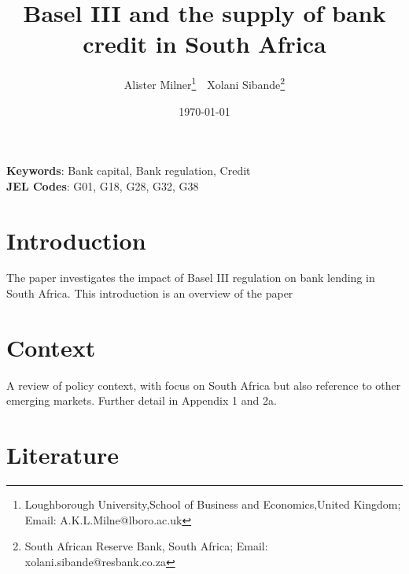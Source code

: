 \documentclass[
]{article}
\author{}
\date{\vspace{-2.5em}}
\begin{document}
\title{Basel III and the supply of bank credit in South Africa}


\author { 
Alister Milner\footnote{Loughborough University,School of Business and Economics,United Kingdom; Email: A.K.L.Milne@lboro.ac.uk}  \,\, 
Xolani Sibande\footnote{South African Reserve Bank, South Africa; Email: xolani.sibande@resbank.co.za}
}
\date{\today}
\maketitle

\begin{abstract}


\end{abstract}

\noindent\textbf{Keywords}: Bank capital, Bank regulation, Credit   \\
\textbf{JEL Codes}: G01, G18, G28, G32, G38
\newpage

\hypertarget{introduction}{%
\section{Introduction}\label{introduction}}

The paper investigates the impact of Basel III regulation on bank lending in South Africa. This introduction is an overview of the paper

\hypertarget{context}{%
\section{Context}\label{context}}

A review of policy context, with focus on South Africa but also reference to other emerging markets. Further detail in Appendix 1 and 2a.

\hypertarget{literature}{%
\section{Literature}\label{literature}}

\citet{osborne2017good}

\citet{jokipii2008cyclical}

\citet{gambacorta2004does}

\citet{schwert2018bank}

\citet{kim2017effect}

\citet{carlson2013capital}

\citet{tabak2011bank}
\end{document}

